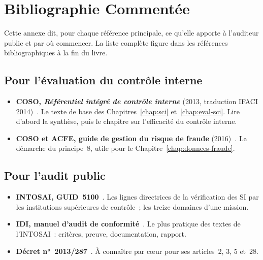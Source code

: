 
\chapter{Bibliographie Commentée}
\label{ann:biblio}

Cette annexe dit, pour chaque référence principale, ce qu'elle apporte à
l'auditeur public et par où commencer. La liste complète figure dans les
références bibliographiques à la fin du livre.

\section*{Pour l'évaluation du contrôle interne}

\begin{itemize}
    \item \textbf{COSO, \emph{Référentiel intégré de contrôle interne}}
          (2013, traduction IFACI 2014)~\cite{coso2013icfr}. Le texte de
          base des Chapitres~\ref{chap:sci} et~\ref{chap:eval-sci}. Lire
          d'abord la synthèse, puis le chapitre sur l'efficacité du
          contrôle interne.
    \item \textbf{COSO et ACFE, guide de gestion du risque de fraude}
          (2016)~\cite{coso2016fraude}. La démarche du principe~8, utile
          pour le Chapitre~\ref{chap:donnees-fraude}.
\end{itemize}

\section*{Pour l'audit public}

\begin{itemize}
    \item \textbf{INTOSAI, GUID~5100}~\cite{intosai2019guid5100}. Les
          lignes directrices de la vérification des SI par les
          institutions supérieures de contrôle~; les treize domaines
          d'une mission.
    \item \textbf{IDI, manuel d'audit de conformité}~\cite{idi2021conformite}.
          Le plus pratique des textes de l'INTOSAI~: critères, preuve,
          documentation, rapport.
    \item \textbf{Décret n°~2013/287}~\cite{decret2013287consupe}. À
          connaître par cœur pour ses articles~2, 3, 5 et~28.
\end{itemize}

